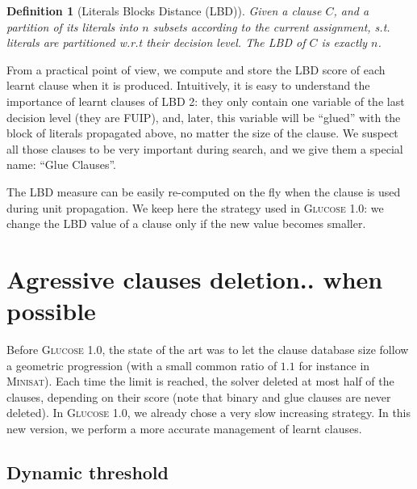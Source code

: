 \documentclass[letterpaper]{article}
\newtheorem{definition}{Definition}
\newcommand{\minisat}{\textsc{Minisat}\xspace}
\newcommand{\mdcl}{\textsc{Glucose}\xspace}
\begin{document}
\begin{definition}[Literals Blocks Distance (LBD)]
  Given a clause $C$, and a partition of its literals into
  $n$ subsets according to the current assignment, s.t. literals are
  partitioned w.r.t their decision level. The LBD
  of $C$ is exactly $n$.
\end{definition}

From a practical point of view, we compute and store the LBD score of
each learnt clause when it is produced. Intuitively,
it is easy to understand the importance of learnt clauses of LBD 2:
they only contain one variable of the last decision level (they are
FUIP), and, later, this variable will be ``glued'' with the block of
literals propagated above, no matter the size of the clause. We
suspect all those clauses to be very important during search, and we
give them a special name: ``Glue Clauses''.


The LBD measure can be easily re-computed on the fly when the clause
is used during unit propagation. We keep here the strategy used in
\mdcl 1.0: we change the LBD value of a clause only if the new value
becomes smaller.



\section{Agressive clauses deletion.. when possible}

Before \mdcl 1.0, the state of the art was to let the clause database
size follow a geometric progression (with a small common ratio of
$1.1$ for instance in \minisat). Each time the limit is reached, the
solver deleted at most half of the clauses, depending on their score
(note that binary and glue clauses are never deleted).  In \mdcl 1.0,
we already chose a very slow increasing strategy. In this new version,
we perform a more accurate management of learnt clauses.

\subsection{Dynamic threshold}
\end{document}
